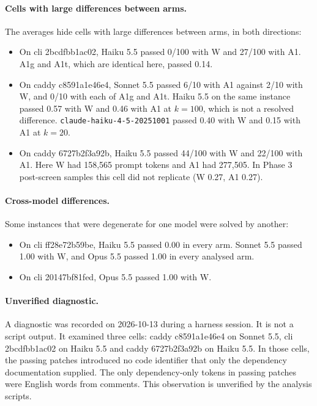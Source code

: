 \paragraph{Cells with large differences between arms.} The averages hide cells with large differences between arms, in both directions:
\begin{itemize}
\item On cli 2bcdfbb1ac02, Haiku 5.5 passed 0/100 with W and 27/100 with A1. A1g and A1t, which are identical here, passed 0.14.
\item On caddy c8591a1e46e4, Sonnet 5.5 passed 6/10 with A1 against 2/10 with W, and 0/10 with each of A1g and A1t. Haiku 5.5 on the same instance passed 0.57 with W and 0.46 with A1 at $k=100$, which is not a resolved difference. \texttt{claude-haiku-4-5-20251001} passed 0.40 with W and 0.15 with A1 at $k=20$.
\item On caddy 6727b2f3a92b, Haiku 5.5 passed 44/100 with W and 22/100 with A1. Here W had 158,565 prompt tokens and A1 had 277,505. In Phase 3 post-screen samples this cell did not replicate (W 0.27, A1 0.27).
\end{itemize}

\paragraph{Cross-model differences.} Some instances that were degenerate for one model were solved by another:
\begin{itemize}
\item On cli ff28e72b59be, Haiku 5.5 passed 0.00 in every arm. Sonnet 5.5 passed 1.00 with W, and Opus 5.5 passed 1.00 in every analysed arm.
\item On cli 20147bf81fed, Opus 5.5 passed 1.00 with W.
\end{itemize}

\paragraph{Unverified diagnostic.} A diagnostic was recorded on 2026-10-13 during a harness session. It is not a script output. It examined three cells: caddy c8591a1e46e4 on Sonnet 5.5, cli 2bcdfbb1ac02 on Haiku 5.5 and caddy 6727b2f3a92b on Haiku 5.5. In those cells, the passing patches introduced no code identifier that only the dependency documentation supplied. The only dependency-only tokens in passing patches were English words from comments. This observation is unverified by the analysis scripts.

